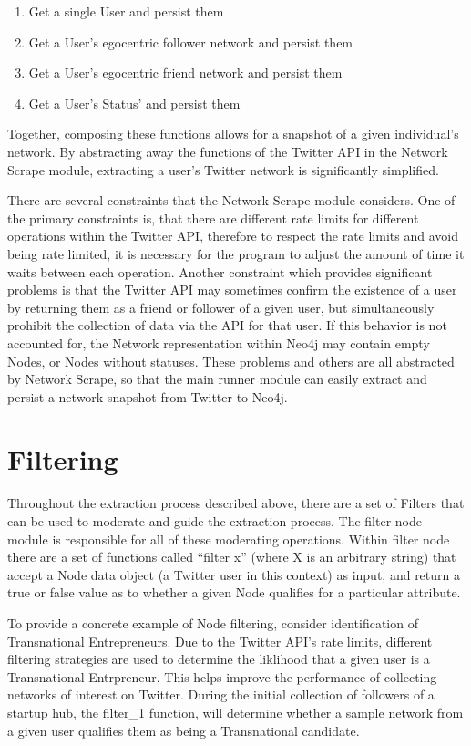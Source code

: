 \begin{enumerate}
\item Get a single User and persist them
\item Get a User's egocentric follower network and persist them
\item Get a User's egocentric friend network and persist them
\item Get a User's Status' and persist them
\end{enumerate}

Together, composing these functions allows for a snapshot of a given
individual's network. By abstracting away the functions of the Twitter
API in the Network Scrape module, extracting a user's Twitter network
is significantly simplified.

There are several constraints that the Network Scrape module
considers. One of the primary constraints is, that there are different
rate limits for different operations within the Twitter API, therefore
to respect the rate limits and avoid being rate limited, it is
necessary for the program to adjust the amount of time it waits
between each operation. Another constraint which provides significant
problems is that the Twitter API may sometimes confirm the existence
of a user by returning them as a friend or follower of a given user,
but simultaneously prohibit the collection of data via the API for
that user. If this behavior is not accounted for, the Network
representation within Neo4j may contain empty Nodes, or Nodes without
statuses. These problems and others are all abstracted by Network
Scrape, so that the main runner module can easily extract and persist
a network snapshot from Twitter to Neo4j.

\section{Filtering}
Throughout the extraction process described above, there are a set of
Filters that can be used to moderate and guide the extraction process.
The filter node module is responsible for all of these moderating
operations.  Within filter node there are a set of functions called
``filter x'' (where X is an arbitrary string) that accept a Node data
object (a Twitter user in this context) as input, and return a true or
false value as to whether a given Node qualifies for a particular
attribute.

To provide a concrete example of Node filtering, consider
identification of Transnational Entrepreneurs. Due to the Twitter
API's rate limits, different filtering strategies are used to
determine the liklihood that a given user is a Transnational
Entrpreneur. This helps improve the performance of collecting networks
of interest on Twitter. During the initial collection of followers of
a startup hub, the filter\_1 function, will determine whether a sample
network from a given user qualifies them as being a Transnational
candidate.

